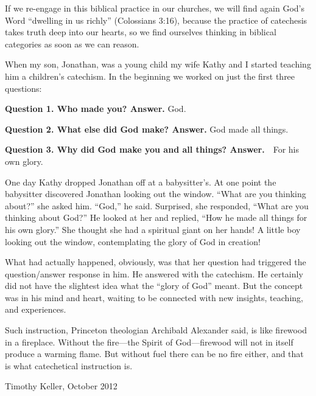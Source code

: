 \documentclass[00-main.tex]{subfiles}
\begin{document}
If we re-engage in this biblical practice in our churches, we will find again God's Word ``dwelling in us richly'' (Colossians 3:16), because the practice of catechesis takes truth deep into our hearts, so we find ourselves thinking in biblical categories as soon as we can reason.

When my son, Jonathan, was a young child my wife Kathy and I started teaching him a children's catechism. In the beginning we worked on just the first three questions:

\textbf{Question 1. Who made you?\newline
Answer.} God.

\textbf{Question 2. What else did God make?\newline
Answer.} God made all things.

\textbf{Question 3. Why did God make you and all things?\newline
Answer.}\ \ For his own glory.

One day Kathy dropped Jonathan off at a babysitter's. At one point the babysitter discovered Jonathan looking out the window. ``What are you thinking about?'' she asked him. ``God,'' he said. Surprised, she responded, ``What are you thinking about God?'' He looked at her and replied, ``How he made all things for his own glory.'' She thought she had a spiritual giant on her hands! A little boy looking out the window, contemplating the glory of God in creation!

What had actually happened, obviously, was that her question had triggered the question/answer response in him. He answered with the catechism. He certainly did not have the slightest idea what the ``glory of God'' meant. But the concept was in his mind and heart, waiting to be connected with new insights, teaching, and experiences.

Such instruction, Princeton theologian Archibald Alexander said, is like firewood in a fireplace. Without the fire\thinspace{}---\thinspace{}the Spirit of God\thinspace{}---\thinspace{}firewood will not in itself produce a warming flame. But without fuel there can be no fire either, and that is what catechetical instruction is.

\bigskip

{\raggedleft
Timothy Keller, October 2012}

\cleardoublepage
\end{document}
